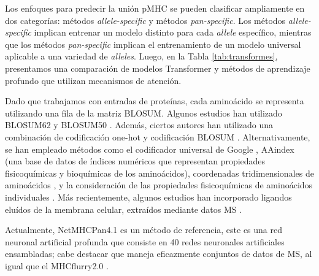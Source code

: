 Los enfoques para predecir la unión pMHC se pueden clasificar ampliamente en dos categorías: métodos \textit{allele-specific} y métodos \textit{pan-specific}. Los métodos \textit{allele-specific} implican entrenar un modelo distinto para cada \textit{allele} específico, mientras que los métodos \textit{pan-specific} implican el entrenamiento de un modelo universal aplicable a una variedad de \textit{alleles}. Luego, en la Tabla \ref{tab:transformes}, presentamos una comparación de modelos Transformer y métodos de aprendizaje profundo que utilizan mecanismos de atención.

Dado que trabajamos con entradas de proteínas, cada aminoácido se representa utilizando una fila de la matriz BLOSUM. Algunos estudios han utilizado BLOSUM62 \citep{jin2021deep, ye2021mathla, zhao2019peptide, o2018mhcflurry} y BLOSUM50 \citep{yang2021deepnetbim, hu2019acme}. Además, ciertos autores han utilizado una combinación de codificación one-hot y codificación BLOSUM \citep{liu2021deepseqpanii, jokinen2021predicting, zeng2019quantification, zeng2019deepligand}. Alternativamente, se han empleado métodos como el codificador universal de Google \citep{kubick2021predicting}, AAindex \citep{kawashima2000aaindex, li2021deepimmuno} (una base de datos de índices numéricos que representan propiedades fisicoquímicas y bioquímicas de los aminoácidos), coordenadas tridimensionales de aminoácidos \citep{shi2020deepantigen}, y la consideración de las propiedades fisicoquímicas de aminoácidos individuales \citep{moris2021current, montemurro2021nettcr, luu2021predicting}. Más recientemente, algunos estudios han incorporado ligandos eluídos de la membrana celular, extraídos mediante datos MS \citep{zhouprioritizing, reynisson2020netmhcpan, reynisson2020improved, o2020mhcflurry, alvarez2019nnalign_ma}.

Actualmente, NetMHCPan4.1 \citep{reynisson2020netmhcpan} es un método de referencia, este es una red neuronal artificial profunda  que consiste en 40 redes neuronales artificiales ensambladas; cabe destacar que maneja eficazmente conjuntos de datos de MS, al igual que el MHCflurry2.0 \citep{o2020mhcflurry}.

